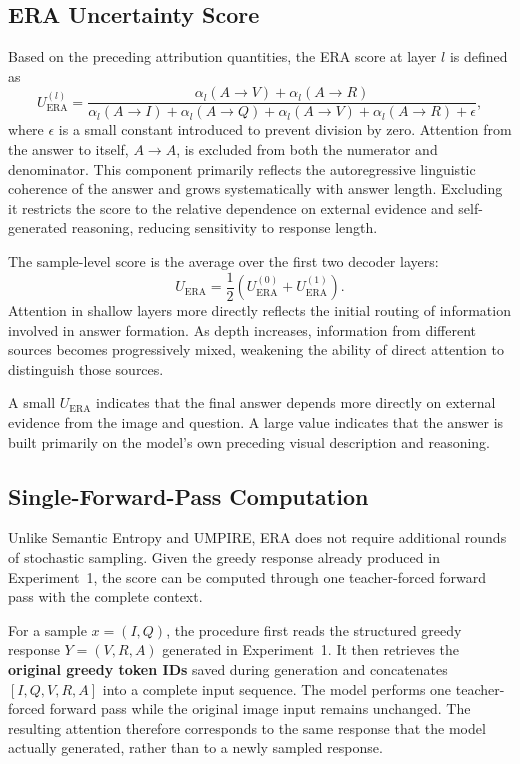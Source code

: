 \subsection{ERA Uncertainty Score}
\label{subsec:era_score}

Based on the preceding attribution quantities, the ERA score at layer $l$ is defined as
\[
U_{\mathrm{ERA}}^{(l)}
=
\frac{
\alpha_l(A\rightarrow V)+
\alpha_l(A\rightarrow R)
}{
\alpha_l(A\rightarrow I)+
\alpha_l(A\rightarrow Q)+
\alpha_l(A\rightarrow V)+
\alpha_l(A\rightarrow R)+\epsilon
},
\]
where $\epsilon$ is a small constant introduced to prevent division by zero. Attention from the answer to itself, $A\rightarrow A$, is excluded from both the numerator and denominator. This component primarily reflects the autoregressive linguistic coherence of the answer and grows systematically with answer length. Excluding it restricts the score to the relative dependence on external evidence and self-generated reasoning, reducing sensitivity to response length.

The sample-level score is the average over the first two decoder layers:
\[
U_{\mathrm{ERA}}
=
\frac{1}{2}
\left(
U_{\mathrm{ERA}}^{(0)}+
U_{\mathrm{ERA}}^{(1)}
\right).
\]
Attention in shallow layers more directly reflects the initial routing of information involved in answer formation. As depth increases, information from different sources becomes progressively mixed, weakening the ability of direct attention to distinguish those sources.

A small $U_{\mathrm{ERA}}$ indicates that the final answer depends more directly on external evidence from the image and question. A large value indicates that the answer is built primarily on the model's own preceding visual description and reasoning.

\subsection{Single-Forward-Pass Computation}
\label{subsec:era_computation}

Unlike Semantic Entropy and UMPIRE, ERA does not require additional rounds of stochastic sampling. Given the greedy response already produced in Experiment~1, the score can be computed through one teacher-forced forward pass with the complete context.

For a sample $x=(I,Q)$, the procedure first reads the structured greedy response $Y=(V,R,A)$ generated in Experiment~1. It then retrieves the \textbf{original greedy token IDs} saved during generation and concatenates $[I,Q,V,R,A]$ into a complete input sequence. The model performs one teacher-forced forward pass while the original image input remains unchanged. The resulting attention therefore corresponds to the same response that the model actually generated, rather than to a newly sampled response.

